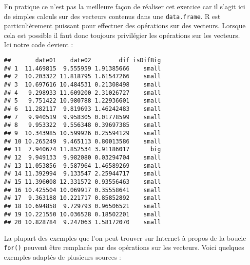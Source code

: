 \documentclass[]{book}
\newenvironment{Shaded}{\begin{snugshade}}{\end{snugshade}}
\newcommand{\KeywordTok}[1]{\textcolor[rgb]{0.13,0.29,0.53}{\textbf{#1}}}
\newcommand{\DataTypeTok}[1]{\textcolor[rgb]{0.13,0.29,0.53}{#1}}
\newcommand{\DecValTok}[1]{\textcolor[rgb]{0.00,0.00,0.81}{#1}}
\newcommand{\StringTok}[1]{\textcolor[rgb]{0.31,0.60,0.02}{#1}}
\newcommand{\OperatorTok}[1]{\textcolor[rgb]{0.81,0.36,0.00}{\textbf{#1}}}
\newcommand{\NormalTok}[1]{#1}
\theoremstyle{definition}
\theoremstyle{definition}
\theoremstyle{definition}
\theoremstyle{remark}
\begin{document}
En pratique ce n'est pas la meilleure façon de réaliser cet exercice car
il s'agit ici de simples calculs sur des vecteurs contenus dans une
\texttt{data.frame}. R est particulièrement puissant pour effectuer des
opérations sur des vecteurs. Lorsque cela est possible il faut donc
toujours privilégier les opérations sur les vecteurs. Ici notre code
devient :

\begin{Shaded}
\end{Shaded}

\begin{verbatim}
##       date01    date02        dif isDifBig
## 1  11.469815  9.555959 1.91385666    small
## 2  10.203322 11.818795 1.61547266    small
## 3  10.697616 10.484531 0.21308498    small
## 4   9.298933 11.609200 2.31026727    small
## 5   9.751422 10.980788 1.22936601    small
## 6  11.282117  9.819693 1.46242483    small
## 7   9.940519  9.958305 0.01778599    small
## 8   9.953322  9.556348 0.39697385    small
## 9  10.343985 10.599926 0.25594129    small
## 10 10.265249  9.465113 0.80013586    small
## 11  7.940674 11.852534 3.91186017      big
## 12  9.949133  9.982080 0.03294704    small
## 13 11.053856  9.587964 1.46589269    small
## 14 11.392994  9.133547 2.25944717    small
## 15 11.396008 12.331572 0.93556463    small
## 16 10.425504 10.069917 0.35558641    small
## 17  9.363188 10.221717 0.85852892    small
## 18 10.694858  9.729793 0.96506521    small
## 19 10.221550 10.036528 0.18502201    small
## 20 10.828784  9.247063 1.58172070    small
\end{verbatim}

La plupart des exemples que l'on peut trouver sur Internet à propos de
la boucle \texttt{for()} peuvent être remplacés par des opérations sur
les vecteurs. Voici quelques exemples adaptés de plusieurs sources :
\end{document}
